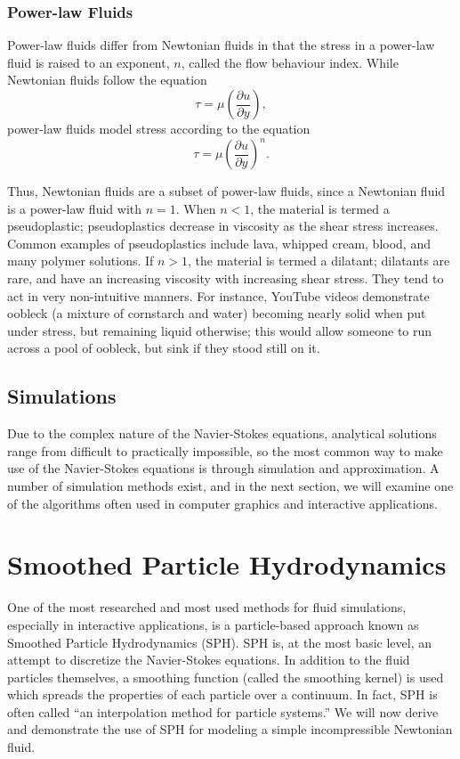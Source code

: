 \documentclass[a4paper,twocolumn]{article}
\begin{document}
\subsubsection{Power-law Fluids}
Power-law fluids differ from Newtonian fluids in that the stress in a power-law fluid is raised to an exponent, $n$, called the flow behaviour index. While Newtonian fluids follow the equation
\[\tau = \mu \left( \frac{\partial u}{\partial y} \right),\]
power-law fluids model stress according to the equation
\[\tau = \mu \left( \frac{\partial u}{\partial y} \right)^n.\]


Thus, Newtonian fluids are a subset of power-law fluids, since a Newtonian fluid is a power-law fluid with $n=1$. When $n<1$, the material is termed a pseudoplastic; pseudoplastics decrease in viscosity as the shear stress increases. Common examples of pseudoplastics include lava, whipped cream, blood, and many polymer solutions. If $n>1$, the material is termed a dilatant; dilatants are rare, and have an increasing viscosity with increasing shear stress. They tend to act in very non-intuitive manners. For instance, YouTube videos demonstrate oobleck (a mixture of cornstarch and water) becoming nearly solid when put under stress, but remaining liquid otherwise; this would allow someone to run across a pool of oobleck, but sink if they stood still on it.

\subsection{Simulations}
Due to the complex nature of the Navier-Stokes equations, analytical solutions range from difficult to practically impossible, so the most common way to make use of the Navier-Stokes equations is through simulation and approximation. A number of simulation methods exist, and in the next section, we will examine one of the algorithms often used in computer graphics and interactive applications.

\section{Smoothed Particle Hydrodynamics}
One of the most researched and most used methods for fluid simulations, especially in interactive applications, is a particle-based approach known as Smoothed Particle Hydrodynamics (SPH). SPH is, at the most basic level, an attempt to discretize the Navier-Stokes equations. In addition to the fluid particles themselves, a smoothing function (called the smoothing kernel) is used which spreads the properties of each particle over a continuum. In fact, SPH is often called ``an interpolation method for particle systems.'' We will now derive and demonstrate the use of SPH for modeling a simple incompressible Newtonian fluid.
\end{document}
